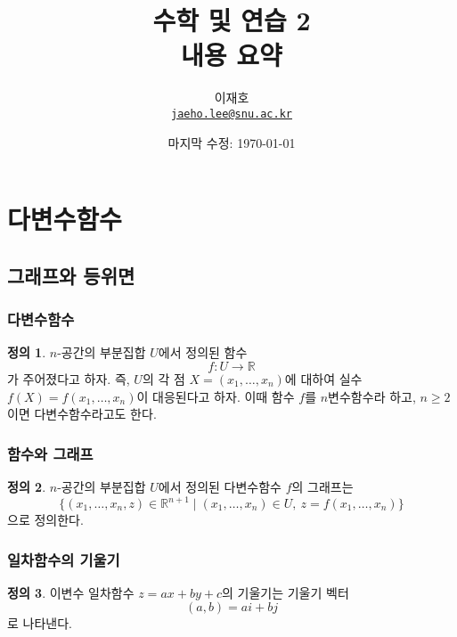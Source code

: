 \documentclass[unfonts,oneside,a4paper]{oblivoir}
\title{수학 및 연습 2\\내용 요약}
\author{이재호\\\href{mailto:jaeho.lee@snu.ac.kr}{\texttt{jaeho.lee@snu.ac.kr}}}
\date{마지막 수정: \today}
\theoremstyle{definition}
\newtheorem{definition}{정의}[subsubsection]
\theoremstyle{theorem}
\renewcommand{\vec}[1]{\bm{\mathit{#1}}}
\begin{document}
\maketitle

\setcounter{section}{9}
\section{다변수함수}
\subsection{그래프와 등위면}
\subsubsection{다변수함수}

\begin{definition}
    $n$-공간의 부분집합 $U$에서 정의된 함수
    \begin{equation*}
        f: U \rightarrow \mathbb R
    \end{equation*}
    가 주어졌다고 하자.
    즉, $U$의 각 점 $X = (x_1, \dots, x_n)$에 대하여 실수 $f(X) = f(x_1, \dots, x_n)$이 대응된다고 하자.
    이때 함수 $f$를 $n$변수함수라 하고, $n \geq 2$이면 다변수함수라고도 한다.
\end{definition}

\subsubsection{함수와 그래프}

\begin{definition}
    $n$-공간의 부분집합 $U$에서 정의된 다변수함수 $f$의 그래프는
    \begin{equation*}
        \{(x_1, \dots, x_n, z) \in \mathbb R^{n + 1} \mid (x_1, \dots, x_n) \in U,\ z = f(x_1, \dots, x_n)\}
    \end{equation*}
    으로 정의한다.
\end{definition}

\subsubsection{일차함수의 기울기}

\begin{definition}
    이변수 일차함수 $z = ax + by + c$의 기울기는 기울기 벡터
    \begin{equation*}
        (a, b) = a \vec i + b \vec j
    \end{equation*}
    로 나타낸다.
\end{definition}
\end{document}
